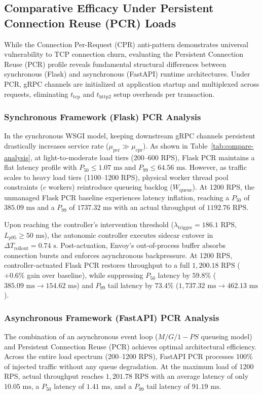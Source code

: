 \documentclass{ieeeaccess}
\begin{document}
	
	\subsection{Comparative Efficacy Under Persistent Connection Reuse (PCR) Loads}
	\label{sec5.3_pcr_comparison}
	
	While the Connection Per-Request (CPR) anti-pattern demonstrates universal vulnerability to TCP connection churn, evaluating the Persistent Connection Reuse (PCR) profile reveals fundamental structural differences between synchronous (Flask) and asynchronous (FastAPI) runtime architectures. Under PCR, gRPC channels are initialized at application startup and multiplexed across requests, eliminating $t_{\text{tcp}}$ and $t_{\text{http2}}$ setup overheads per transaction.
	
	\subsubsection{Synchronous Framework (Flask) PCR Analysis}
	In the synchronous WSGI model, keeping downstream gRPC channels persistent drastically increases service rate ($\mu_{\text{pcr}} \gg \mu_{\text{cpr}}$). As shown in Table~\ref{tab:compare-analysis}, at light-to-moderate load tiers (200--600 RPS), Flask PCR maintains a flat latency profile with $P_{50} \le 1.07\text{ ms}$ and $P_{99} \le 64.56\text{ ms}$. However, as traffic scales to heavy load tiers (1100--1200 RPS), physical worker thread pool constraints ($c$ workers) reintroduce queueing backlog ($W_{\text{queue}}$). At 1200 RPS, the unmanaged Flask PCR baseline experiences latency inflation, reaching a $P_{50}$ of $385.09\text{ ms}$ and a $P_{99}$ of $1737.32\text{ ms}$ with an actual throughput of $1192.76\text{ RPS}$.
	
	Upon reaching the controller's intervention threshold ($\lambda_{\text{trigger}} = 186.1\text{ RPS}$, $L_{p95} \ge 50\text{ ms}$), the autonomic controller executes sidecar cutover in $\Delta T_{\text{rollout}} = 0.74\text{ s}$. Post-actuation, Envoy's out-of-process buffer absorbs connection bursts and enforces asynchronous backpressure. At 1200 RPS, controller-actuated Flask PCR restores throughput to a full $1,200.18\text{ RPS}$ ($+0.6\%$ gain over baseline), while suppressing $P_{50}$ latency by $59.8\%$ ($385.09\text{ ms} \to 154.62\text{ ms}$) and $P_{99}$ tail latency by $73.4\%$ ($1,737.32\text{ ms} \to 462.13\text{ ms}$).
	
	\subsubsection{Asynchronous Framework (FastAPI) PCR Analysis}
	The combination of an asynchronous event loop ($M/G/1-PS$ queueing model) and Persistent Connection Reuse (PCR) achieves optimal architectural efficiency. Across the entire load spectrum (200--1200 RPS), FastAPI PCR processes 100\% of injected traffic without any queue degradation. At the maximum load of 1200 RPS, actual throughput reaches $1,201.78\text{ RPS}$ with an average latency of only $10.05\text{ ms}$, a $P_{50}$ latency of $1.41\text{ ms}$, and a $P_{99}$ tail latency of $91.19\text{ ms}$.
	
\end{document}
